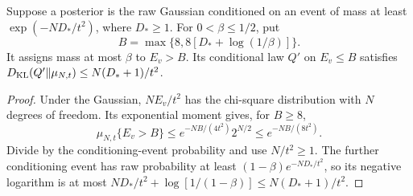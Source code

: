 \begin{lemma}
\label{lem:standalone-readout-tail}
Suppose a posterior is the raw Gaussian conditioned on an event of mass at
least $\exp(-ND_*/t^2)$, where $D_*\ge1$. For $0<\beta\le1/2$, put
\[
 B=\max\{8,8[D_*+\log(1/\beta)]\}.
\]
It assigns mass at most $\beta$ to $E_v>B$. Its conditional law $Q'$ on
$E_v\le B$ satisfies
$D_{\rm KL}(Q'\Vert\mu_{N,t})\le N(D_*+1)/t^2$.
\end{lemma}
\begin{proof}
Under the Gaussian, $NE_v/t^2$ has the chi-square distribution with $N$
degrees of freedom. Its exponential moment gives, for $B\ge8$,
\[
 \mu_{N,t}\{E_v>B\}
 \le e^{-NB/(4t^2)}2^{N/2}
 \le e^{-NB/(8t^2)}.
\]
Divide by the conditioning-event probability and use $N/t^2\ge1$.
The further conditioning event has raw probability at least
$(1-\beta)e^{-ND_*/t^2}$, so its negative logarithm is at most
$ND_*/t^2+\log[1/(1-\beta)]\le N(D_*+1)/t^2$.
\end{proof}

